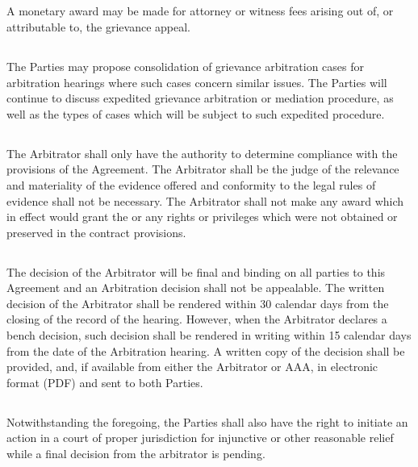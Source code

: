 {        \subsection{}
        A monetary award may be made for attorney or witness fees arising out of, or attributable to, the grievance appeal.
        \subsection{}
        The Parties may propose consolidation of grievance arbitration cases for arbitration hearings where such cases concern similar issues. The Parties will continue to discuss expedited grievance arbitration or mediation procedure, as well as the types of cases which will be subject to such expedited procedure.
        \subsection{}
        The Arbitrator shall only have the authority to determine compliance with the provisions of the Agreement. The Arbitrator shall be the judge of the relevance and materiality of the evidence offered and conformity to the legal rules of evidence shall not be necessary. The Arbitrator shall not make any award which in effect would grant the \counterpartytitle or \companyname any rights or privileges which were not obtained or preserved in the contract provisions.
        \subsection{}
        The decision of the Arbitrator will be final and binding on all parties to this Agreement and an Arbitration decision shall not be appealable. The written decision of the Arbitrator shall be rendered within 30 calendar days from the closing of the record of the hearing. However, when the Arbitrator declares a bench decision, such decision shall be rendered in writing within 15 calendar days from the date of the Arbitration hearing. A written copy of the decision shall be provided, and, if available from either the Arbitrator or AAA, in electronic format (PDF) and sent to both Parties.
        \subsection{}
        Notwithstanding the foregoing, the Parties shall also have the right to initiate an action in a court of proper jurisdiction for injunctive or other reasonable relief while a final decision from the arbitrator is pending.
}

